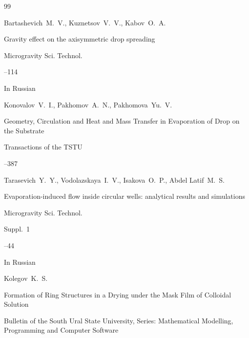 \begin{thebibliography}{99}




\by Bartashevich~M.~V., Kuznetsov~V.~V., Kabov~O.~A.

\paper Gravity effect on the axisymmetric drop spreading 

\jour Microgravity Sci. Technol.




--114





\lang In Russian

\by Konovalov~V.~I., Pakhomov~A.~N., Pakhomova~Yu.~V.

\paper  Geometry, Circulation and Heat and Mass Transfer   in Evaporation of Drop on the Substrate 

\jour Transactions of the TSTU




--387




\by Tarasevich~Y.~Y., Vodolazskaya~I.~V., Isakova~O.~P., Abdel Latif~M.~S. 

\paper Evaporation-induced flow inside circular wells: analytical results and simulations 

\jour Microgravity Sci. Technol.



\issueinfo Suppl.~1

--44





\lang In Russian

\by Kolegov~K.~S.

\paper Formation of Ring Structures in a Drying under the Mask Film of Colloidal Solution

\jour  	Bulletin of the South Ural State University, Series: Mathematical Modelling, Programming and Computer Software


\end{thebibliography}
